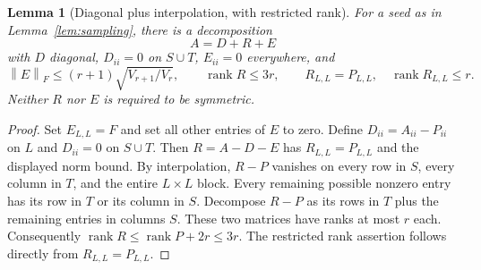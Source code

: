 \documentclass[11pt]{article}
\numberwithin{equation}{section}
\newtheorem{lemma}[theorem]{Lemma}
\theoremstyle{definition}\newtheorem{definition}[theorem]{Definition}
\theoremstyle{remark}\newtheorem{remark}[theorem]{Remark}
\newcommand{\1}{\mathbf 1}\newcommand{\diag}{\operatorname{diag}}
\newcommand{\rank}{\operatorname{rank}}\newcommand{\tr}{\operatorname{tr}}
\newcommand{\norm}[1]{\left\lVert#1\right\rVert}\newcommand{\abs}[1]{\left|#1\right|}
\begin{document}
\begin{lemma}[Diagonal plus interpolation, with restricted rank]\label{lem:completion}
For a seed as in Lemma~\ref{lem:sampling}, there is a decomposition
\begin{equation}\label{eq:completion}
 A=D+R+E
\end{equation}
with $D$ diagonal, $D_{ii}=0$ on $S\cup T$, $E_{ii}=0$ everywhere, and
\begin{equation}\label{eq:completion-bounds}
 \norm E_F\le(r+1)\sqrt{V_{r+1}/V_r},\qquad
 \rank R\le3r,\qquad R_{L,L}=P_{L,L},\quad\rank R_{L,L}\le r.
\end{equation}
Neither $R$ nor $E$ is required to be symmetric.
\end{lemma}
\begin{proof}
Set $E_{L,L}=F$ and set all other entries of $E$ to zero. Define $D_{ii}=A_{ii}-P_{ii}$ on $L$ and $D_{ii}=0$ on $S\cup T$. Then $R=A-D-E$ has $R_{L,L}=P_{L,L}$ and the displayed norm bound. By interpolation, $R-P$ vanishes on every row in $S$, every column in $T$, and the entire $L\times L$ block. Every remaining possible nonzero entry has its row in $T$ or its column in $S$. Decompose $R-P$ as its rows in $T$ plus the remaining entries in columns $S$. These two matrices have ranks at most $r$ each. Consequently $\rank R\le\rank P+2r\le3r$. The restricted rank assertion follows directly from $R_{L,L}=P_{L,L}$.
\end{proof}
\end{document}
